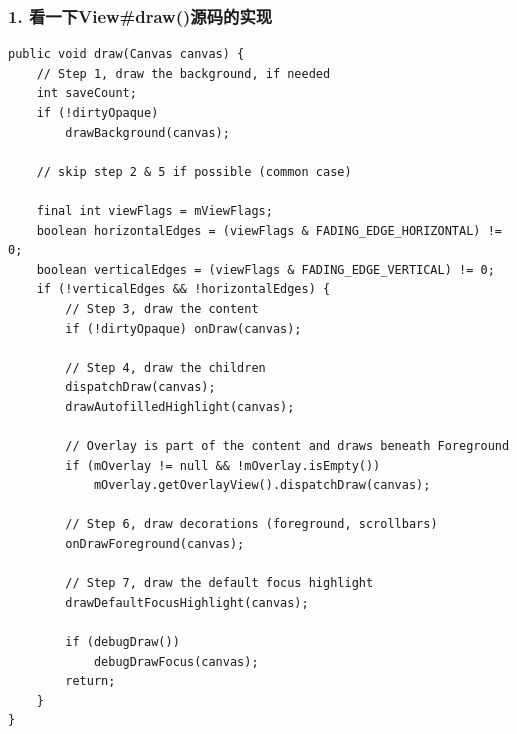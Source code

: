 \documentclass[9pt, b5paper]{article}
\begin{document}
\subsubsection{1. 看一下View\#draw()源码的实现}
\label{sec-1-6-1}
\begin{verbatim}
public void draw(Canvas canvas) {
    // Step 1, draw the background, if needed
    int saveCount;
    if (!dirtyOpaque) 
        drawBackground(canvas);

    // skip step 2 & 5 if possible (common case)

    final int viewFlags = mViewFlags;
    boolean horizontalEdges = (viewFlags & FADING_EDGE_HORIZONTAL) != 0;
    boolean verticalEdges = (viewFlags & FADING_EDGE_VERTICAL) != 0;
    if (!verticalEdges && !horizontalEdges) {
        // Step 3, draw the content
        if (!dirtyOpaque) onDraw(canvas);

        // Step 4, draw the children
        dispatchDraw(canvas);
        drawAutofilledHighlight(canvas);

        // Overlay is part of the content and draws beneath Foreground
        if (mOverlay != null && !mOverlay.isEmpty()) 
            mOverlay.getOverlayView().dispatchDraw(canvas);

        // Step 6, draw decorations (foreground, scrollbars)
        onDrawForeground(canvas);

        // Step 7, draw the default focus highlight
        drawDefaultFocusHighlight(canvas);

        if (debugDraw()) 
            debugDrawFocus(canvas);
        return;
    }
}
\end{verbatim}
\end{document}
